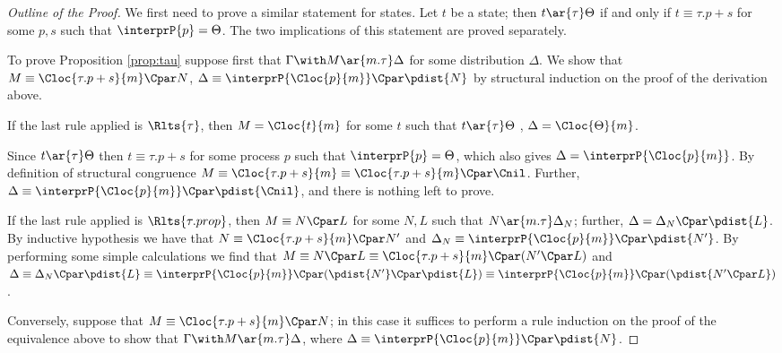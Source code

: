 \documentclass{LMCS}
\begin{document}
\begin{proof}[Outline of the Proof]
We first need to prove a similar statement for states. 
Let $t$ be a state; then $t \ar{\tau} \Theta$ if and 
only if $t \equiv \tau.p + s$ for some $p, s$ such that 
$\interprP{p} = \Theta$. The two implications 
of this statement are proved separately. 



To prove Proposition \ref{prop:tau} suppose first 
that $\Gamma \with M \ar{m.\tau} \Delta$ for 
some distribution $\Delta$. We show that 
$M \equiv \Cloc{\tau.p + s}{m} \Cpar N$, $\Delta 
\equiv \interprP{\Cloc{p}{m}} \Cpar \pdist{N}$ 
by structural induction on the proof of the derivation above. 

If the last rule applied is $\Rlts{\tau}$, then $M = \Cloc{t}{m}$ 
for some $t$ such that $t \ar{\tau} \Theta$ , $\Delta = \Cloc{\Theta}{m}$. 

Since $t \ar{\tau} \Theta$ then $t \equiv \tau.p + s$ for some 
process $p$ such that $\interprP{p} = \Theta$, which also gives 
$\Delta = \interprP{\Cloc{p}{m}}$. 
By definition of structural congruence $M \equiv \Cloc{\tau.p + s}{m} 
\equiv \Cloc{\tau.p + s}{m} \Cpar \Cnil$. Further, $\Delta 
\equiv \interprP{\Cloc{p}{m}} \Cpar \pdist{\Cnil}$, and there 
is nothing left to prove.

If the last rule applied is $\Rlts{\tau.prop}$, then 
$M \equiv N \Cpar L$ for some $N, L$ such that 
$N \ar{m.\tau} \Delta_N$; further, $\Delta = \Delta_N \Cpar \pdist{L}$. 
By inductive hypothesis we have that $N \equiv \Cloc{\tau.p + s}{m} \Cpar N'$ 
and $\Delta_N \equiv \interprP{\Cloc{p}{m}} \Cpar \pdist{N'}$. 
By performing some simple calculations we find that 
$M \equiv N \Cpar L \equiv \Cloc{\tau.p + s}{m} \Cpar (N' \Cpar L)$ 
and $\Delta \equiv \Delta_N \Cpar \pdist{L} \equiv \interprP{\Cloc{p}{m}} \Cpar 
( \pdist{N'} \Cpar \pdist{L} ) \equiv \interprP{\Cloc{p}{m}} \Cpar (\pdist{N' \Cpar L})$.

Conversely, suppose that $M \equiv \Cloc{\tau.p + s}{m} \Cpar N$; in 
this case it suffices to perform a rule induction on the proof of 
the equivalence above to show that $\Gamma \with M \ar{m.\tau} 
\Delta$, where $\Delta \equiv \interprP{\Cloc{p}{m}} \Cpar \pdist{N}$.
\end{proof}
\end{document}
